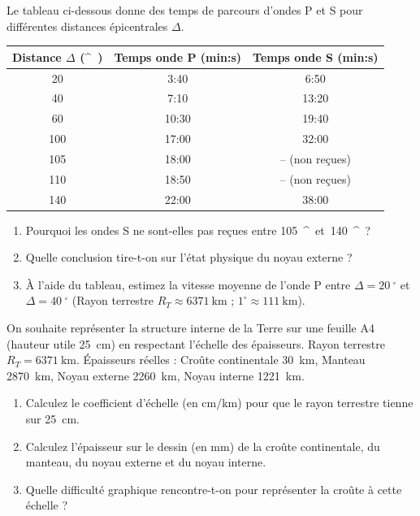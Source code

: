 \documentclass[11pt]{article}
\providecommand{\degree}{^{\circ}}
\begin{document}
\begin{exercice}
Le tableau ci-dessous donne des temps de parcours d'ondes P et S pour différentes distances épicentrales $\Delta$.

\begin{center}
\begin{tabular}{|c|c|c|}
\hline
Distance $\Delta$ (\si{\degree}) & Temps onde P (min:s) & Temps onde S (min:s) \\
\hline
20 & 3:40 & 6:50 \\
40 & 7:10 & 13:20 \\
60 & 10:30 & 19:40 \\
100 & 17:00 & 32:00 \\
105 & 18:00 & -- (non reçues) \\
110 & 18:50 & -- (non reçues) \\
140 & 22:00 & 38:00 \\
\hline
\end{tabular}
\end{center}

\begin{enumerate}
    \item Pourquoi les ondes S ne sont-elles pas reçues entre \SI{105}{\degree} et \SI{140}{\degree} ?
    \item Quelle conclusion tire-t-on sur l'état physique du noyau externe ?
    \item À l'aide du tableau, estimez la vitesse moyenne de l'onde P entre $\Delta = \SI{20}{\degree}$ et $\Delta = \SI{40}{\degree}$ (Rayon terrestre $R_T \approx \SI{6371}{\kilo\metre}$ ; $1^{\circ} \approx \SI{111}{\kilo\metre}$).
\end{enumerate}
\end{exercice}

\begin{exercice}
On souhaite représenter la structure interne de la Terre sur une feuille A4 (hauteur utile \SI{25}{\centi\metre}) en respectant l'échelle des épaisseurs. Rayon terrestre $R_T = \SI{6371}{\kilo\metre}$.
Épaisseurs réelles : Croûte continentale \SI{30}{\kilo\metre}, Manteau \SI{2870}{\kilo\metre}, Noyau externe \SI{2260}{\kilo\metre}, Noyau interne \SI{1221}{\kilo\metre}.
\begin{enumerate}
    \item Calculez le coefficient d'échelle (en \si{\centi\metre/\kilo\metre}) pour que le rayon terrestre tienne sur \SI{25}{\centi\metre}.
    \item Calculez l'épaisseur sur le dessin (en \si{\milli\metre}) de la croûte continentale, du manteau, du noyau externe et du noyau interne.
    \item Quelle difficulté graphique rencontre-t-on pour représenter la croûte à cette échelle ?
\end{enumerate}
\end{exercice}
\end{document}
